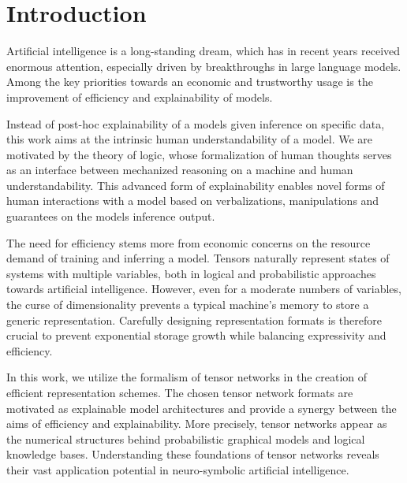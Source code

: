 \chapter{Introduction}\label{cha:introduction}

Artificial intelligence is a long-standing dream, which has in recent years received enormous attention, especially driven by breakthroughs in large language models.
Among the key priorities towards an economic and trustworthy usage is the improvement of efficiency and explainability of models.

Instead of post-hoc explainability of a models given inference on specific data, this work aims at the intrinsic human understandability of a model.
We are motivated by the theory of logic, whose formalization of human thoughts serves as an interface between mechanized reasoning on a machine and human understandability.
This advanced form of explainability enables novel forms of human interactions with a model based on verbalizations, manipulations and guarantees on the models inference output.

The need for efficiency stems more from economic concerns on the resource demand of training and inferring a model.
Tensors naturally represent states of systems with multiple variables, both in logical and probabilistic approaches towards artificial intelligence. %
However, even for a moderate numbers of variables, the curse of dimensionality prevents a typical machine’s memory to store a generic representation.
Carefully designing representation formats is therefore crucial to prevent exponential storage growth while balancing expressivity and efficiency.

In this work, we utilize the formalism of tensor networks in the creation of efficient representation schemes.
The chosen tensor network formats are motivated as explainable model architectures and provide a synergy between the aims of efficiency and explainability.
More precisely, tensor networks appear as the numerical structures behind probabilistic graphical models and logical knowledge bases.
Understanding these foundations of tensor networks reveals their vast application potential in neuro-symbolic artificial intelligence.

